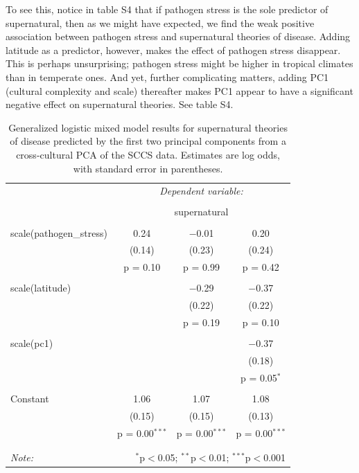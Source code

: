\documentclass[
]{article}
\begin{document}
To see this, notice in table S4 that if pathogen stress is the sole predictor of supernatural, then as we might have expected, we find the weak positive association between pathogen stress and supernatural theories of disease. Adding latitude as a predictor, however, makes the effect of pathogen stress disappear. This is perhaps unsurprising; pathogen stress might be higher in tropical climates than in temperate ones. And yet, further complicating matters, adding PC1 (cultural complexity and scale) thereafter makes PC1 appear to have a significant negative effect on supernatural theories. See table S4.

\begin{table}[!htbp] \centering 
  \caption{Generalized logistic mixed model results for supernatural theories of disease predicted by the first two principal components from a cross-cultural PCA of the SCCS data. Estimates are log odds, with standard error in parentheses.} 
  \label{} 
\begin{tabular}{@{\extracolsep{5pt}}lccc} 
\\[-1.8ex] & \multicolumn{3}{c}{\textit{Dependent variable:}} \\ 
\cline{2-4} 
\\[-1.8ex] & \multicolumn{3}{c}{supernatural} \\ 
\hline \\[-1.8ex] 
 scale(pathogen\_stress) & 0.24 & $-$0.01 & 0.20 \\ 
  & (0.14) & (0.23) & (0.24) \\ 
  & p = 0.10 & p = 0.99 & p = 0.42 \\ 
  & & & \\ 
 scale(latitude) &  & $-$0.29 & $-$0.37 \\ 
  &  & (0.22) & (0.22) \\ 
  &  & p = 0.19 & p = 0.10 \\ 
  & & & \\ 
 scale(pc1) &  &  & $-$0.37 \\ 
  &  &  & (0.18) \\ 
  &  &  & p = 0.05$^{*}$ \\ 
  & & & \\ 
 Constant & 1.06 & 1.07 & 1.08 \\ 
  & (0.15) & (0.15) & (0.13) \\ 
  & p = 0.00$^{***}$ & p = 0.00$^{***}$ & p = 0.00$^{***}$ \\ 
  & & & \\ 
\hline \\[-1.8ex] 
\textit{Note:}  & \multicolumn{3}{r}{$^{*}$p$<$0.05; $^{**}$p$<$0.01; $^{***}$p$<$0.001} \\ 
\end{tabular} 
\end{table}
\end{document}
